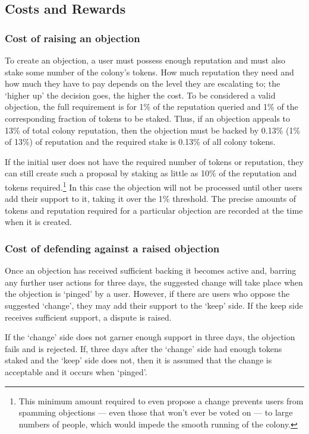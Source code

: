 \subsection{Costs and Rewards}\label{sec:costs-of-disputes}
\subsubsection{Cost of raising an objection}
To create an objection, a user must possess enough reputation and must also stake some number of the colony's tokens. How much reputation they need and how much they have to pay depends on the level they are escalating to; the `higher up' the decision goes, the higher the cost. To be considered a valid objection, the full requirement is for 1\% of the reputation queried and 1\% of the corresponding fraction of tokens to be staked. Thus, if an objection appeals to 13\% of total colony reputation, then the objection must be backed by 0.13\% (1\% of 13\%) of reputation and the required stake is 0.13\% of all colony tokens.

If the initial user does not have the required number of tokens or reputation, they can still create such a proposal by staking as little as 10\% of the reputation and tokens required.\footnote{This minimum amount required to even propose a change prevents users from spamming objections --- even those that won’t ever be voted on --- to large numbers of people, which would impede the smooth running of the colony.} In this case the objection will not be processed until other users add their support to it, taking it over the 1\% threshold. The precise amounts of tokens and reputation required for a particular objection are recorded at the time when it is created.

\subsubsection{Cost of defending against a raised objection}
Once an objection has received sufficient backing it becomes active and, barring any further user actions for three days, the suggested change will take place when the objection is `pinged' by a user. However, if there are users who oppose the suggested `change', they may add their support to the `keep' side. If the keep side receives sufficient support, a dispute is raised. 

If the `change' side does not garner enough support in three days, the objection fails and is rejected. If, three days after the `change' side had enough tokens staked and the `keep' side does not, then it is assumed that the change is acceptable and it occurs when `pinged'. 

